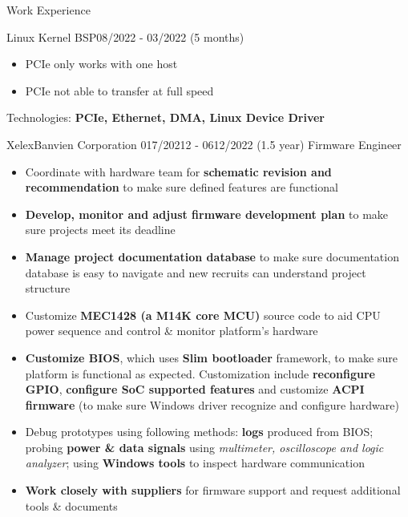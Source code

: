 \documentclass{resume} %
\begin{document}
\begin{rSection}{Work Experience}
\begin{rCompanySubsection}
\begin{rProjectSubsubsection}{Linux Kernel BSP}{08/2022 - 03/2022 (5 months)}
\begin{itemize}
\begin{itemize}
                    \item PCIe only works with one host
                    \item PCIe not able to transfer at full speed
                \end{itemize}
            \end{itemize}
            \hspace*{2.5em}Technologies: \textbf{PCIe, Ethernet, DMA, Linux Device Driver}
        \end{rProjectSubsubsection}
    \end{rCompanySubsection}
\begin{rCompanySubsection}
    {XelexBanvien Corporation}
    {017/20212 - 0612/2022 (1.5 year)}
    {Firmware Engineer}
    {}

\begin{itemize}
     \item Coordinate with hardware team for \textbf{schematic revision and recommendation} to make sure defined features are functional
     \item \textbf{Develop, monitor and adjust firmware development plan} to make sure projects meet its deadline
     \item \textbf{Manage project documentation database} to make sure documentation database is easy to navigate and new recruits can understand project structure
     \item Customize \textbf{MEC1428 (a M14K core MCU)} source code to aid CPU power sequence and control \& monitor platform's hardware
     \item \textbf{Customize BIOS}, which uses {\bf Slim bootloader} framework, to make sure platform is functional as expected. Customization include \textbf{reconfigure GPIO}, \textbf{configure SoC supported features} and customize \textbf{ACPI firmware} (to make sure Windows driver recognize and configure hardware)
     \item Debug prototypes using following methods: \textbf{logs} produced from BIOS; probing \textbf{power \& data signals} using \textit{multimeter, oscilloscope and logic analyzer}; using \textbf{Windows tools} to inspect hardware communication
     \item \textbf{Work closely with suppliers} for firmware support and request additional tools \& documents

\end{itemize}
\end{rCompanySubsection}


\end{rSection}
\end{document}
